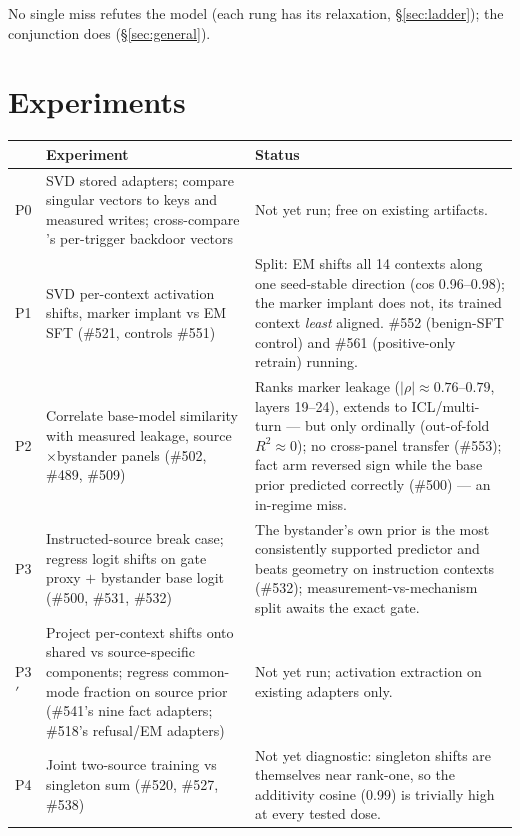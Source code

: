 \documentclass[11pt]{article}
\begin{document}
No single miss refutes the model (each rung has its relaxation, \S\ref{sec:ladder}); the conjunction does (\S\ref{sec:general}).

\section{Experiments}
\label{sec:exp}

\begin{center}
\small
\begin{tabular}{@{}p{0.7cm}p{6.3cm}p{7.4cm}@{}}
\toprule
 & Experiment & Status \\
\midrule
P0 & SVD stored adapters; compare singular vectors to keys and measured writes; cross-compare \cite{engels2025}'s per-trigger backdoor vectors & Not yet run; free on existing artifacts. \\
\addlinespace[2pt]
P1 & SVD per-context activation shifts, marker implant vs EM SFT (\#521, controls \#551) & Split: EM shifts all 14 contexts along one seed-stable direction (cos 0.96--0.98); the marker implant does not, its trained context \emph{least} aligned. \#552 (benign-SFT control) and \#561 (positive-only retrain) running. \\
\addlinespace[2pt]
P2 & Correlate base-model similarity with measured leakage, source$\times$bystander panels (\#502, \#489, \#509) & Ranks marker leakage ($|\rho| \approx 0.76$--$0.79$, layers 19--24), extends to ICL/multi-turn --- but only ordinally (out-of-fold $R^2 \approx 0$); no cross-panel transfer (\#553); fact arm reversed sign while the base prior predicted correctly (\#500) --- an in-regime miss. \\
\addlinespace[2pt]
P3 & Instructed-source break case; regress logit shifts on gate proxy $+$ bystander base logit (\#500, \#531, \#532) & The bystander's own prior is the most consistently supported predictor and beats geometry on instruction contexts (\#532); measurement-vs-mechanism split awaits the exact gate. \\
\addlinespace[2pt]
P3$'$ & Project per-context shifts onto shared vs source-specific components; regress common-mode fraction on source prior (\#541's nine fact adapters; \#518's refusal/EM adapters) & Not yet run; activation extraction on existing adapters only. \\
\addlinespace[2pt]
P4 & Joint two-source training vs singleton sum (\#520, \#527, \#538) & Not yet diagnostic: singleton shifts are themselves near rank-one, so the additivity cosine (0.99) is trivially high at every tested dose. \\

\end{tabular}
\end{center}
\end{document}
